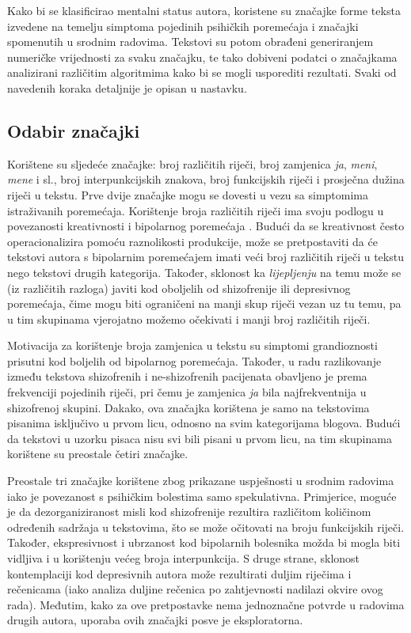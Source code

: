 \documentclass[10pt, a4paper]{article}
\begin{document}
Kako bi se klasificirao mentalni status autora, koristene su značajke forme teksta izvedene na temelju simptoma pojedinih psihičkih poremećaja i značajki spomenutih u srodnim radovima. Tekstovi su potom obrađeni generiranjem numeričke vrijednosti za svaku značajku, te tako dobiveni podatci o značajkama analizirani različitim algoritmima kako bi se mogli usporediti rezultati. Svaki od navedenih koraka detaljnije je opisan u nastavku.

\subsection{Odabir značajki}

Korištene su sljedeće značajke: broj različitih riječi, broj zamjenica \emph{ja}, \emph{meni}, \emph{mene} i sl., broj interpunkcijskih znakova, broj funkcijskih riječi i prosječna dužina riječi u tekstu. Prve dvije značajke mogu se dovesti u vezu sa simptomima istraživanih poremećaja. Korištenje broja različitih riječi ima svoju podlogu u povezanosti kreativnosti i bipolarnog poremećaja \citep{crea}. Budući da se kreativnost često operacionalizira pomoću raznolikosti produkcije, može se pretpostaviti da će tekstovi autora s bipolarnim poremećajem imati veći broj različitih riječi u tekstu nego tekstovi drugih kategorija. Također, sklonost ka \emph{lijepljenju} na temu može se (iz različitih razloga) javiti kod oboljelih od shizofrenije ili depresivnog poremećaja, čime mogu biti ograničeni na manji skup riječi vezan uz tu temu, pa u tim skupinama vjerojatno možemo očekivati i manji broj različitih riječi.

Motivacija za korištenje broja zamjenica u tekstu su simptomi grandioznosti prisutni kod boljelih od bipolarnog poremećaja. Također, u radu \citep{strous-2009} razlikovanje između tekstova shizofrenih i ne-shizofrenih pacijenata obavljeno je prema frekvenciji pojedinih riječi, pri čemu je zamjenica \emph{ja} bila najfrekventnija u shizofrenoj skupini. Dakako, ova značajka korištena je samo na tekstovima pisanima isključivo u prvom licu, odnosno na svim kategorijama blogova. Budući da tekstovi u uzorku pisaca nisu svi bili pisani u prvom licu, na tim skupinama korištene su preostale četiri značajke.

Preostale tri značajke korištene zbog prikazane uspješnosti u srodnim radovima \citep{kristo} iako je povezanost s psihičkim bolestima samo spekulativna. Primjerice, moguće je da dezorganiziranost misli kod shizofrenije rezultira različitom količinom određenih sadržaja u tekstovima, što se može očitovati na broju funkcijskih riječi. Također, ekspresivnost i ubrzanost kod bipolarnih bolesnika možda bi mogla biti vidljiva i u korištenju većeg broja interpunkcija. S druge strane, sklonost kontemplaciji kod depresivnih autora može rezultirati duljim riječima i rečenicama (iako analiza duljine rečenica po zahtjevnosti nadilazi okvire ovog rada). Međutim, kako za ove pretpostavke nema jednoznačne potvrde u radovima drugih autora, uporaba ovih značajki posve je eksploratorna.
\end{document}
